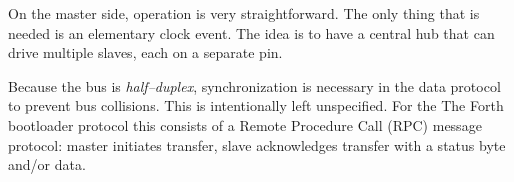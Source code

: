 \documentclass[12pt]{article}
\begin{document}
On the master side, operation is very straightforward. The only thing
that is needed is an elementary clock event. The idea is to have a
central hub that can drive multiple slaves, each on a separate pin.

Because the bus is \emph{half--duplex}, synchronization is necessary
in the data protocol to prevent bus collisions. This is intentionally
left unspecified. For the The Forth bootloader protocol this consists of a
Remote Procedure Call (RPC) message protocol: master initiates
transfer, slave acknowledges transfer with a status byte and/or data.

% 
\end{document}
